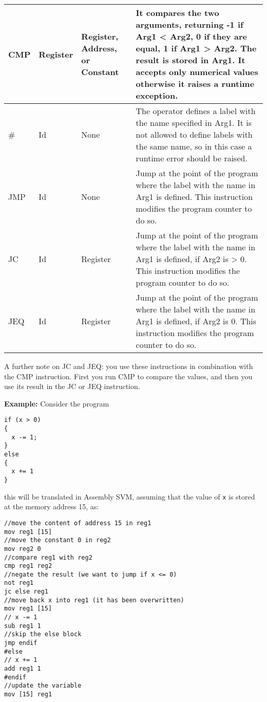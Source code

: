 \begin{longtable}{|p{1cm}|p{2cm}|p{2cm}|p{5cm}|}
	\hline
	CMP & Register & Register, Address, or Constant & It compares the two arguments, returning -1 if Arg1 < Arg2, 0 if they are equal, 1 if Arg1 > Arg2. The result is stored in Arg1. It accepts only numerical values otherwise it raises a runtime exception. \\
	\hline
	\# & Id & None & The operator defines a label with the name specified in Arg1. It is not allowed to define labels with the same name, so in this case a runtime error should be raised. \\
	\hline
	JMP & Id & None & Jump at the point of the program where the label with the name in Arg1 is defined. This instruction modifies the program counter to do so. \\
	\hline
	JC & Id & Register & Jump at the point of the program where the label with the name in Arg1 is defined, if Arg2 is > 0. This instruction modifies the program counter to do so. \\
	\hline
	JEQ & Id & Register & Jump at the point of the program where the label with the name in Arg1 is defined, if Arg2 is 0. This instruction modifies the program counter to do so. \\
	\hline
\end{longtable}

\noindent
A further note on JC and JEQ: you use these instructions in combination with the CMP instruction. First you run CMP to compare the values, and then you use its result in the JC or JEQ instruction.

\vspace{0.5cm}
\noindent
\textbf{Example:} Consider the program

\begin{lstlisting}
if (x > 0)
{
  x -= 1;
}
else
{
  x += 1
}
\end{lstlisting}

\noindent
this will be translated in Assembly SVM, assuming that the value of \texttt{x} is stored at the memory address 15, as:

\begin{lstlisting}
//move the content of address 15 in reg1
mov reg1 [15]
//move the constant 0 in reg2
mov reg2 0 
//compare reg1 with reg2
cmp reg1 reg2
//negate the result (we want to jump if x <= 0)
not reg1
jc else reg1
//move back x into reg1 (it has been overwritten)
mov reg1 [15]
// x -= 1
sub reg1 1
//skip the else block 
jmp endif
#else
// x += 1
add reg1 1
#endif
//update the variable
mov [15] reg1
\end{lstlisting}